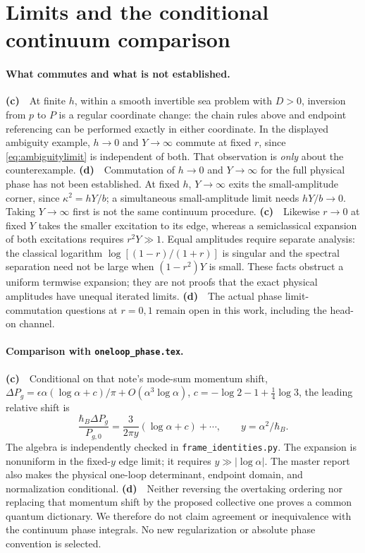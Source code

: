 \documentclass[11pt,a4paper]{article}
\newcommand{\Lc}{\textbf{(c)}\ }
\newcommand{\Ld}{\textbf{(d)}\ }
\newcommand{\id}{\texttt{frame\_\allowbreak identities.py}}
\begin{document}
\section{Limits and the conditional continuum comparison}
\paragraph{What commutes and what is not established.}
\Lc\ At finite $h$, within a smooth invertible sea problem with $D>0$, inversion
from $p$ to $P$ is a regular coordinate change: the chain rules above and
endpoint referencing can be performed exactly in either coordinate.
In the displayed ambiguity example, $h\to0$ and $Y\to\infty$ commute at
fixed $r$, since \eqref{eq:ambiguitylimit} is independent of both.
That observation is \emph{only} about the counterexample.
\Ld\ Commutation of $h\to0$ and $Y\to\infty$ for the full physical phase
has not been established. At fixed $h$, $Y\to\infty$ exits the small-amplitude
corner, since $\kappa^2=hY/b$; a simultaneous small-amplitude limit needs
$hY/b\to0$. Taking $Y\to\infty$ first is not the same continuum procedure.
\Lc\ Likewise $r\to0$ at fixed $Y$ takes the smaller excitation to its edge,
whereas a semiclassical expansion of both excitations requires $r^2Y\gg1$.
Equal amplitudes require separate analysis: the classical logarithm
$\log[(1-r)/(1+r)]$ is singular and the spectral separation need not be large
when $(1-r^2)Y$ is small. These facts obstruct a uniform termwise expansion;
they are not proofs that the exact physical amplitudes have unequal iterated
limits. \Ld\ The actual phase limit-commutation questions at $r=0,1$ remain
open in this work, including the head-on channel.

\paragraph{Comparison with \texttt{oneloop\_phase.tex}.}
\Lc\ Conditional on that note's mode-sum momentum shift,
$\Delta P_g=\epsilon\alpha(\log\alpha+c)/\pi+O(\alpha^3\log\alpha)$,
$c=-\log2-1+\frac14\log3$, the leading relative shift is
\begin{equation}
 \frac{\hbar_B\Delta P_g}{P_{g,0}}
 =\frac{3}{2\pi y}(\log\alpha+c)+\cdots,\qquad y=\alpha^2/\hbar_B .
 \label{eq:nonuniform}
\end{equation}
The algebra is independently checked in \id. The expansion is nonuniform
in the fixed-$y$ edge limit; it requires $y\gg|\log\alpha|$.
The master report also makes the physical one-loop determinant, endpoint
domain, and normalization conditional. \Ld\ Neither reversing the overtaking
ordering nor replacing that momentum shift by the proposed collective one
proves a common quantum dictionary. We therefore do not claim agreement or
inequivalence with the continuum phase integrals. No new regularization or
absolute phase convention is selected.
\end{document}
